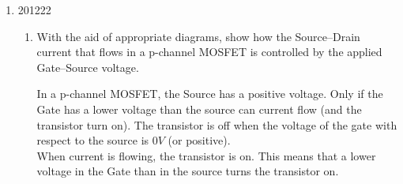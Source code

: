 \documentclass[10pt,\jkfside,a4paper]{article}
\begin{document}
\begin{enumerate}
\item

\begin{examquestion}{2012}{2}{2}

\begin{enumerate}[label=(\alph*)]

\item{With the aid of appropriate diagrams, show how the Source–Drain 
current that flows in a p-channel MOSFET is controlled by the applied 
Gate–Source voltage.}

In a p-channel MOSFET, the Source has a positive voltage. Only if the 
Gate has a lower voltage than the source can current flow (and the transistor turn on).
The transistor is off when the voltage of the gate with respect to the source is $0V$ 
(or positive).\\
When current is flowing, the transistor is on.
This means that a lower voltage in the Gate than in the source turns the transistor on.


\end{enumerate}
\end{examquestion}
\end{enumerate}
\end{document}
